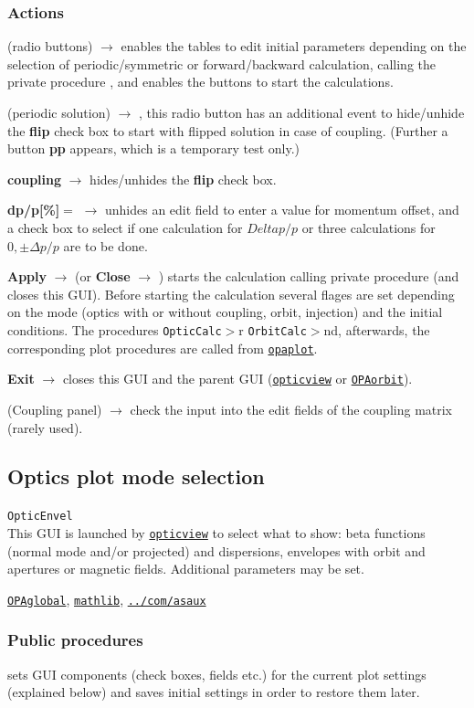 \documentclass[12pt]{article}
\newcommand\code[1]{{\tt #1}}
\newcommand{\ofld}[1]{\colorbox{black!15}{{\bf #1}}}
\newcommand{\ofldx}[1]{\colorbox{black!15}{(#1)}}
\newcommand\guico[1]{{\color{blue}\code{#1}}}
\newcommand{\unico}[1]{{\color{burntorange}\code{#1}}}
\newcommand{\evcod}[2]{\ofld{#1} $\rightarrow$ \guico{#2}}
\newcommand{\evcodx}[2]{\ofldx{#1} $\rightarrow$ \guico{#2}}
\newcommand{\prcod}[2]{\opauni{#1}$>$\unico{#2}}
\newcommand{\opagui}[1]{\colorbox{blue!20}{\code{#1}}}
\newcommand{\oguih}[2]{\subsection{\label{#2}#1}{\Huge\opagui{#2}}\\}
\newcommand{\ogui}[1]{\hyperref[#1]{\opagui{#1}}}
\newcommand{\opauni}[1]{\colorbox{orange!30}{\code{#1}}}
\newcommand{\ouni}[1]{\hyperref[#1]{\opauni{#1}}}
\newcommand{\uses}[1]{\flushleft {\bf Uses:} #1}
\newcommand{\desc}[1]{#1}
\newcommand{\act}[1]{\subsubsection*{Actions} #1}
\newcommand{\ppro}[1]{\subsubsection*{Public procedures} #1}
\begin{document}
\act{
\evcodx{radio buttons}{rbutClick} enables the tables to edit initial parameters depending on the selection of periodic/symmetric or forward/backward calculation, calling the private procedure \guico{set\_pan\_ini}, and enables the buttons to start the calculations.

\evcodx{periodic solution}{rbutperChange}, this radio button has an additional event to hide/unhide the \ofld{flip} check box to start with flipped solution in case of coupling. (Further a button \ofld{pp} appears, which is a temporary test only.)

\evcod{coupling}{chk\_coupChange} hides/unhides the \ofld{flip} check box. 

\evcod{dp/p[\%]$=$}{but\_dppClick} unhides an edit field to enter a value for momentum offset, and a check box to select if one calculation for $Delta p/p$  or three calculations for $0,\pm\Delta p/p$ are to be done.

\evcod{Apply}{butapplyClick} (or \evcod{Close}{butcloClick}) starts the calculation calling private procedure \guico{Go} (and closes this GUI). Before starting the calculation several flages are set depending on the mode (optics with or without coupling, orbit, injection) and the initial conditions. The procedures \prcod{OpticCalc} or \prcod{OrbitCalc} and, afterwards, the corresponding plot procedures are called from \ouni{opaplot}.

\evcod{Exit}{butexitClick} closes this GUI and the parent GUI (\ogui{opticview} or \ogui{OPAorbit}).

\evcodx{Coupling panel}{ed\_couKeyPress,ed\_couExit} check the input into the edit fields of the coupling matrix (rarely used).
}


\oguih{Optics plot mode selection}{OpticEnvel} 

\desc{This GUI is launched by \ogui{opticview} to select what to show: beta functions (normal mode and/or projected) and dispersions, envelopes with orbit and apertures or magnetic fields. Additional parameters may be set.
}

\uses{\ouni{OPAglobal}, \ouni{mathlib}, \ouni{../com/asaux}} 

\ppro{
\guico{Load} sets GUI components (check boxes, fields etc.) for the current plot settings (explained below) and saves initial settings in order to restore them later.
}
\end{document}
